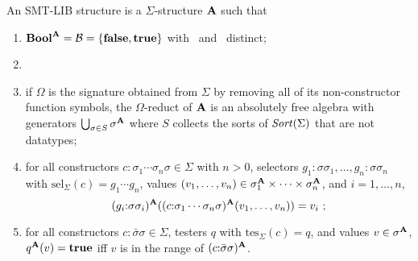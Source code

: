 \begin{definition}
\label{def:structure}
An SMT-LIB structure is a $\Sigma$-structure $\mathbf{A}$ such that

\begin{enumerate}
\item $\textbf{Bool}^{\mathbf{A}} = \mathcal{B} = \{ \textbf{false}, \textbf{true} \}$ with \false\ and \true\ distinct;

\item {}


%

\item
if $\Omega$ is the signature obtained from $\Sigma$ by removing 
all of its non-constructor function symbols,
the $\Omega$-reduct of $\mathbf{A}$ is an absolutely free algebra with 
generators $\bigcup_{ \sigma \in S} \sigma^{\mathbf{A}}$
where $S$ collects the sorts of $\mathit{Sort}(\Sigma)$ that are not datatypes;

\item
for all constructors $c{:}\sigma_1\cdots\sigma_n\sigma \in \Sigma$ with $n>0$,
selectors $g_1{:}\sigma\sigma_1, \ldots, g_n{:}\sigma\sigma_n$ 
with $\mathrm{sel}_\Sigma(c) = g_1\cdots g_n$, 
values $(v_1, \ldots, v_n) \in \sigma_1^{\mathbf{A}} \times \cdots \times \sigma_n^{\mathbf{A}}$,
and
$i=1,\ldots,n$,
\[
 (g_i{:}\sigma\sigma_i)^{\str A}((c{:}\sigma_1\cdots\sigma_n\sigma)^{\str A}(v_1, \ldots, v_n)) = v_i\ ;
\]

\item
for all constructors $c{:}\bar{\sigma}\sigma \in \Sigma$,
testers $q$ with $\mathrm{tes}_\Sigma(c) = q$, and
  values $v \in \sigma^{\mathbf{A}}$,
 $q^{\mathbf{A}}(v) = \textbf{true}$ iff $v$ is in the range of $(c{:}\bar{\sigma}\sigma)^{\mathbf{A}}$.
\end{enumerate}
\end{definition}



